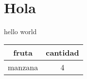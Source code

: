 \documentclass{article}
\begin{document}
\section*{Hola}
\paragraph*{} hello world
\begin{table}[h]
    \begin{tabular}{| c | c |}
        \hline
        fruta&cantidad \\ \hline
        manzana&4 \\ \hline
    \end{tabular}
\end{table}
\end{document}

